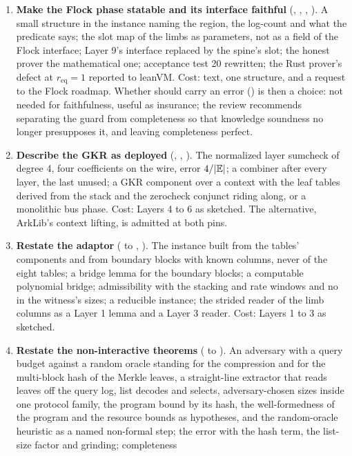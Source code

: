 \begin{enumerate}
  runs and a check that no theorem needs.
\item \textbf{Make the Flock phase statable and its interface faithful} (,
  , , ). A small structure in the instance naming the region, the
  log-count and what the predicate says; the slot map of the limbs as parameters, not as a
  field of the Flock interface; Layer 9's interface replaced by the spine's slot; the honest
  prover the mathematical one; acceptance test 20 rewritten; the Rust prover's defect at
  $r_{\mathrm{eq}} = 1$ reported to leanVM. Cost: text, one structure, and a request to the
  Flock roadmap. Whether  should carry an error () is then
  a choice: not needed for faithfulness, useful as insurance; the review recommends separating
  the guard from completeness so that knowledge soundness no longer presupposes it, and leaving
  completeness perfect.
\item \textbf{Describe the GKR as deployed} (, , ). The
  normalized layer sumcheck of degree 4, four coefficients on the wire, error $4/\lvert \mathbb{E}\rvert$; a
  combiner after every layer, the last unused; a GKR component over a context with the leaf
  tables derived from the stack and the zerocheck conjunct riding along, or a monolithic bus
  phase. Cost: Layers 4 to 6 as sketched. The alternative, ArkLib's context lifting, is admitted
  at both pins.
\item \textbf{Restate the adaptor} ( to , ). The instance built
  from the tables' components and from boundary blocks with known columns, never
   of the eight tables; a bridge lemma for the boundary blocks; a computable
  polynomial bridge; admissibility with the stacking and rate windows and no
   in the witness's sizes; a reducible instance; the strided reader of the limb
  columns as a Layer 1 lemma and a Layer 3 reader. Cost: Layers 1 to 3 as sketched.
\item \textbf{Restate the non-interactive theorems} ( to ). An adversary
  with a query budget against a random oracle standing for the compression and for the
  multi-block hash of the Merkle leaves, a straight-line
  extractor that reads leaves off the query log, list decodes and selects, adversary-chosen
  sizes inside one protocol family, the program bound by its hash, the well-formedness of the
  program and the resource bounds as hypotheses, and the random-oracle heuristic as a named
  non-formal step; the error with the hash term, the list-size factor and grinding; completeness

\end{enumerate}
